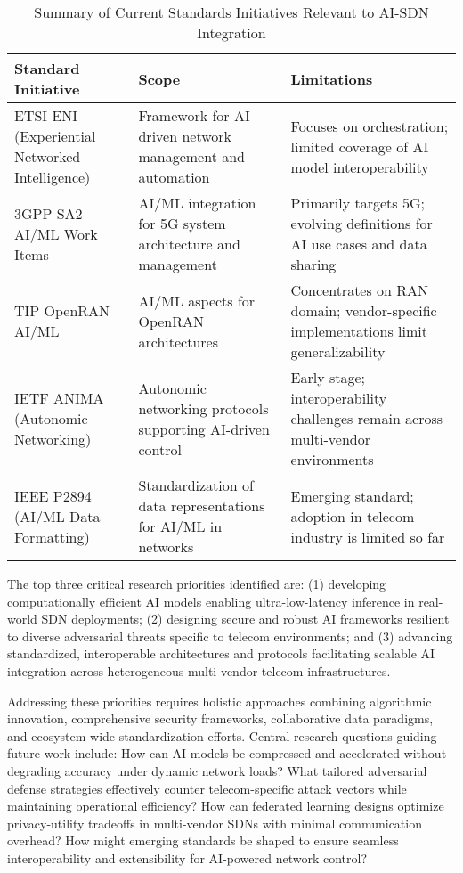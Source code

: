 \documentclass[sigconf]{acmart}
\begin{document}
\begin{table*}[htbp]
\centering
\caption{Summary of Current Standards Initiatives Relevant to AI-SDN Integration}
\label{tab:standards}
\begin{adjustbox}{max width=\textwidth}
\begin{tabular}{@{}lll@{}}
\toprule
\textbf{Standard Initiative} & \textbf{Scope} & \textbf{Limitations} \\ \midrule
ETSI ENI (Experiential Networked Intelligence) & Framework for AI-driven network management and automation & Focuses on orchestration; limited coverage of AI model interoperability \\ 
3GPP SA2 AI/ML Work Items & AI/ML integration for 5G system architecture and management & Primarily targets 5G; evolving definitions for AI use cases and data sharing \\
TIP OpenRAN AI/ML & AI/ML aspects for OpenRAN architectures & Concentrates on RAN domain; vendor-specific implementations limit generalizability \\
IETF ANIMA (Autonomic Networking) & Autonomic networking protocols supporting AI-driven control & Early stage; interoperability challenges remain across multi-vendor environments \\
IEEE P2894 (AI/ML Data Formatting) & Standardization of data representations for AI/ML in networks & Emerging standard; adoption in telecom industry is limited so far \\ \bottomrule
\end{tabular}
\end{adjustbox}
\end{table*}

The top three critical research priorities identified are: (1) developing computationally efficient AI models enabling ultra-low-latency inference in real-world SDN deployments; (2) designing secure and robust AI frameworks resilient to diverse adversarial threats specific to telecom environments; and (3) advancing standardized, interoperable architectures and protocols facilitating scalable AI integration across heterogeneous multi-vendor telecom infrastructures.

Addressing these priorities requires holistic approaches combining algorithmic innovation, comprehensive security frameworks, collaborative data paradigms, and ecosystem-wide standardization efforts. Central research questions guiding future work include: How can AI models be compressed and accelerated without degrading accuracy under dynamic network loads? What tailored adversarial defense strategies effectively counter telecom-specific attack vectors while maintaining operational efficiency? How can federated learning designs optimize privacy-utility tradeoffs in multi-vendor SDNs with minimal communication overhead? How might emerging standards be shaped to ensure seamless interoperability and extensibility for AI-powered network control?
\end{document}
